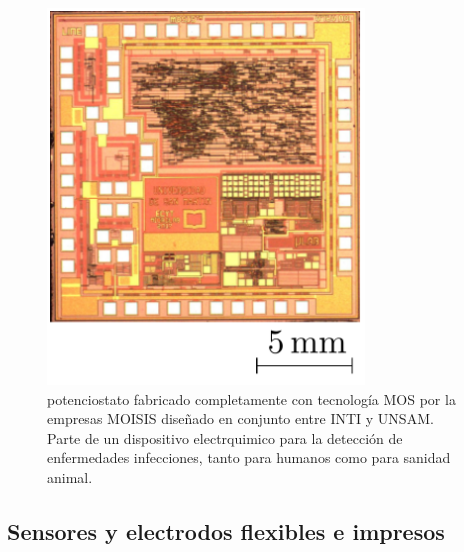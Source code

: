  			\begin{figure}[th!]
			    \begin{center}
			    \includegraphics[width=0.75\textwidth]{Imagenes/potenciostato-chip.pdf}
	       		\caption{potenciostato fabricado completamente con tecnología MOS por la empresas MOISIS diseñado en conjunto entre INTI y UNSAM. Parte de un dispositivo electrquimico para la detección de enfermedades infecciones, tanto para humanos como para sanidad animal. }
	         	\label{fig:pote-onchip}
	     		\end{center}
	     		\end{figure}


  \subsection{Sensores y electrodos flexibles e impresos}

